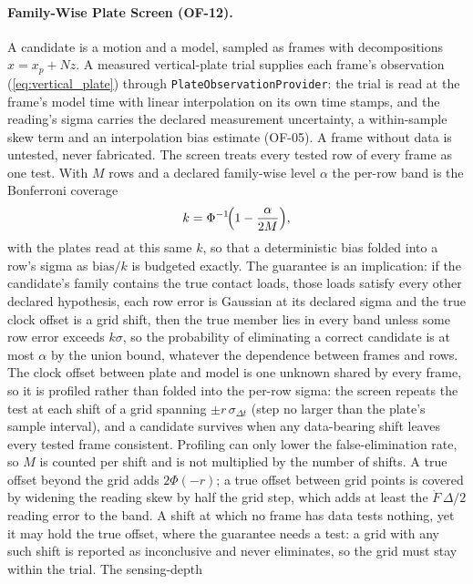 \documentclass[11pt,a4paper]{article}
\begin{document}
\paragraph{Family-Wise Plate Screen (OF-12).}
A candidate is a motion and a model, sampled as frames with decompositions
$x=x_p+Nz$.  A measured vertical-plate trial supplies each frame's observation
(\eqref{eq:vertical_plate}) through \texttt{PlateObservationProvider}: the
trial is read at the frame's model time with linear interpolation on its own
time stamps, and the reading's sigma carries the declared measurement
uncertainty, a within-sample skew term and an interpolation bias estimate
(OF-05).  A frame without data is untested, never fabricated.  The screen
treats every tested row of every frame as one test.  With $M$ rows and a
declared family-wise level $\alpha$ the per-row band is the Bonferroni
coverage
\begin{equation}
k=\Phi^{-1}\!\Bigl(1-\frac{\alpha}{2M}\Bigr),
\label{eq:plate_bonferroni}
\end{equation}
with the plates read at this same $k$, so that a deterministic bias folded
into a row's sigma as $\mathrm{bias}/k$ is budgeted exactly.  The guarantee is
an implication: if the candidate's family contains the true contact loads,
those loads satisfy every other declared hypothesis, each row error is
Gaussian at its declared sigma and the true clock offset is a grid shift, then
the true member lies in every band unless some row error exceeds $k\sigma$, so
the probability of eliminating a correct candidate is at most $\alpha$ by the
union bound, whatever the dependence between frames and rows.  The clock
offset between plate and model is one unknown shared by every frame, so it is
profiled rather than folded into the per-row sigma: the screen repeats the
test at each shift of a grid spanning $\pm r\,\sigma_{\Delta t}$ (step no
larger than the plate's sample interval), and a candidate survives when any
data-bearing shift leaves every tested frame consistent.  Profiling can only
lower the false-elimination rate, so $M$ is counted per shift and is not
multiplied by the number of shifts.  A true offset beyond the grid adds
$2\Phi(-r)$; a true offset between grid points is covered by widening the
reading skew by half the grid step, which adds at least the
$\dot F\,\Delta/2$ reading error to the band.  A shift at which no frame has
data tests nothing, yet it may hold the true offset, where the guarantee
needs a test: a grid with any such shift is reported as inconclusive and
never eliminates, so the grid must stay within the trial.  The sensing-depth
\end{document}
